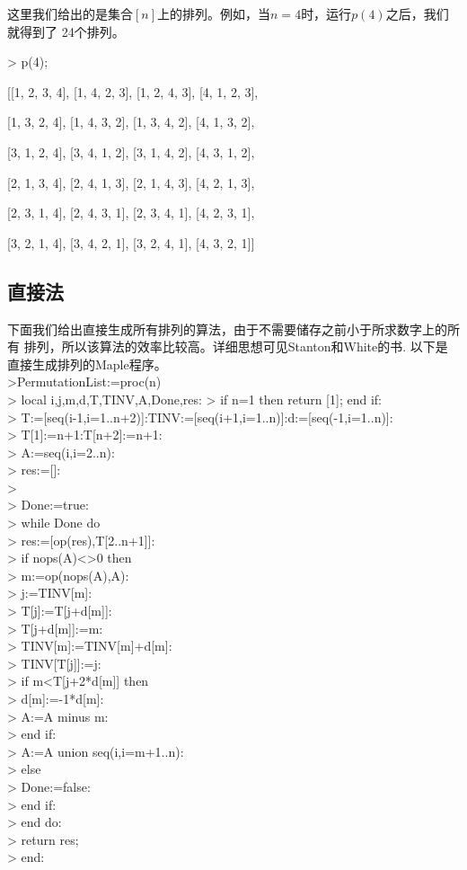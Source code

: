 这里我们给出的是集合$[n]$上的排列。例如，当$n=4$时，运行$p(4)$之后，我们就得到了
24个排列。

> p(4);

  [[1, 2, 3, 4], [1, 4, 2, 3], [1, 2, 4, 3], [4, 1, 2, 3],

        [1, 3, 2, 4], [1, 4, 3, 2], [1, 3, 4, 2], [4, 1, 3, 2],

        [3, 1, 2, 4], [3, 4, 1, 2], [3, 1, 4, 2], [4, 3, 1, 2],

        [2, 1, 3, 4], [2, 4, 1, 3], [2, 1, 4, 3], [4, 2, 1, 3],

        [2, 3, 1, 4], [2, 4, 3, 1], [2, 3, 4, 1], [4, 2, 3, 1],

        [3, 2, 1, 4], [3, 4, 2, 1], [3, 2, 4, 1], [4, 3, 2, 1]]

\subsection{直接法}
下面我们给出直接生成所有排列的算法，由于不需要储存之前小于所求数字上的所有
排列，所以该算法的效率比较高。详细思想可见Stanton和White的书\cite{SW}. 以下是
直接生成排列的Maple程序。
\\
>PermutationList:=proc(n)\\
> local i,j,m,d,T,TINV,A,Done,res:
> if n=1 then return [1]; end if:  \\
> T:=[seq(i-1,i=1..n+2)]:TINV:=[seq(i+1,i=1..n)]:d:=[seq(-1,i=1..n)]:\\
> T[1]:=n+1:T[n+2]:=n+1:\\
> A:={seq(i,i=2..n)}:\\
> res:=[]:\\
>\\
> Done:=true:\\
> while Done do\\
>     res:=[op(res),T[2..n+1]]:\\
>     if nops(A)<>0 then\\
>         m:=op(nops(A),A):\\
>         j:=TINV[m]:\\
>         T[j]:=T[j+d[m]]:\\
>         T[j+d[m]]:=m:\\
>         TINV[m]:=TINV[m]+d[m]:\\
>         TINV[T[j]]:=j:\\
>         if m<T[j+2*d[m]] then\\
>            d[m]:=-1*d[m]:\\
>            A:=A minus {m}:\\
>         end if:\\
>         A:=A union {seq(i,i=m+1..n)}:\\
>     else\\
>         Done:=false:\\
>     end if:\\
> end do:\\
> return res;\\
> end:\\


